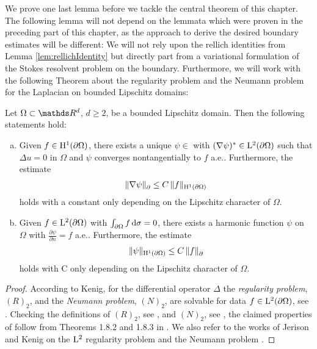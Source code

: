 We prove one last lemma before we tackle the central theorem of this chapter.
The following lemma will not depend on the lemmata which were proven in the preceding part of this chapter, as the approach to derive the desired boundary estimates will be different:
We will not rely upon the rellich identities from Lemma \ref{lem:rellichIdentity} but directly part from a variational formulation of the Stokes resolvent problem on the boundary. 
Furthermore, we will work with the following Theorem about the regularity problem and the Neumann problem for the Laplacian on bounded Lipschitz domains:
\begin{thm}
  \label{thm:jerisonKenig}
  Let $\Omega \subset \R^d$, $d \geq 2$, be a bounded Lipschitz domain. Then the following statements hold:
  \begin{enumerate}[a)]
    \item Given $f \in \mathrm{H}^1(\partial\Omega)$, there exists a unique $\psi \in$ with $(\nabla \psi)^* \in \mathrm{L}^2(\partial\Omega)$ such that $\Delta u = 0$ in $\Omega$ and $\psi$ converges nontangentially to $f$ a.e.. Furthermore, the estimate 
      \begin{align*}
          \|\nabla\psi\|^{}_\partial \leq C\, \|f\|_{\mathrm{H}^1(\partial\Omega)}
      \end{align*}
      holds with a constant only depending on the Lipschitz character of $\Omega$.
    \item Given $f \in \mathrm{L}^2(\partial\Omega)$ with $\int_{\partial\Omega} f \, {\operatorname{d}\!{\sigma}} = 0$, there exists a harmonic function $\psi$ on $\Omega$ with $\frac{\partial\psi}{\partial n} = f$ a.e.. Furthermore, the estimate
      \begin{align*}
          \| \psi\|_{\mathrm{H}^1(\partial\Omega)} \leq C\, \|f\|^{}_\partial
      \end{align*}
      holds with C only depending on the Lipschitz character of $\Omega$.
  \end{enumerate}
\end{thm}

\begin{proof}
  According to Kenig, for the differential operator $\Delta$ the \emph{regularity problem}, $(R)_2$, and the \emph{Neumann problem}, $(N)_2$,  are solvable for data $f \in \mathrm{L}^2(\partial\Omega)$, see \cite[Thm. 2.1.10]{kenigBook}.
  Checking the definitions of $(R)_2$, see \cite[Defn. 1.7.10]{kenigBook}, and $(N)_2$, see \cite[Defn. 1.7.9]{kenigBook}, the claimed properties of follow from Theorems 1.8.2 and 1.8.3 in \cite[Chap. 1]{kenigBook}.
  We also refer to the works of Jerison and Kenig on the $\mathrm{L}^2$ regularity problem \cite{jerisonKenig2} and the Neumann problem \cite{jerisonKenig}.
\end{proof}

